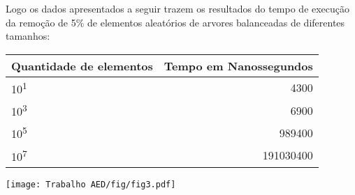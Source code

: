 Logo os dados apresentados a seguir trazem os resultados do tempo de execução da remoção de 5\% de elementos aleatórios de arvores balanceadas de diferentes tamanhos:

    \begin{center}
        \begin{tabular}{| l | r |}
            \hline
            Quantidade de elementos & Tempo em Nanossegundos\\
            \hline
            10\textsuperscript{1} & 4300\\
            10\textsuperscript{3} & 6900\\
            10\textsuperscript{5} & 989400\\
            10\textsuperscript{7} & 191030400\\
            \hline
        \end{tabular}
    \end{center}
    
    \begin{center}
            \texttt{[image: Trabalho AED/fig/fig3.pdf]}
            \label{fig:Grafico 3}
    \end{center}
\pagebreak
